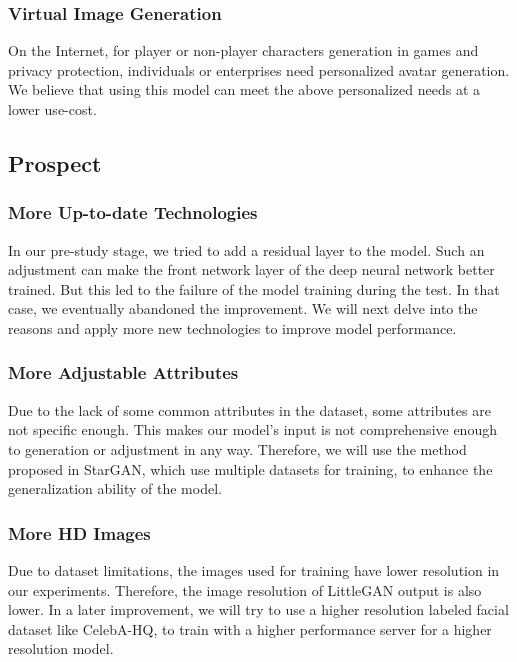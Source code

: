 \subsubsection*{Virtual Image Generation}
On the Internet, for player or non-player characters generation in games and privacy protection,
individuals or enterprises need personalized avatar generation.
We believe that using this model can meet the above personalized needs at a lower use-cost.

\subsection{Prospect}

\subsubsection*{More Up-to-date Technologies}

In our pre-study stage, we tried to add a residual layer to the model.
Such an adjustment can make the front network layer of the deep neural network better trained.
But this led to the failure of the model training during the test.
    In that case, we eventually abandoned the improvement.
We will next delve into the reasons and apply more new technologies to improve model performance.


\subsubsection*{More Adjustable Attributes}

Due to the lack of some common attributes in the dataset,
    some attributes are not specific enough.
This makes our model's input is not comprehensive enough to generation or adjustment in any way.
Therefore, we will use the method proposed in StarGAN,
    which use multiple datasets for training, to enhance the generalization ability of the model.


\subsubsection*{More HD Images}

Due to dataset limitations, the images used for training have lower resolution in our experiments.
Therefore, the image resolution of LittleGAN output is also lower.
In a later improvement, we will try to use a higher resolution labeled facial dataset like CelebA-HQ,
    to train with a higher performance server for a higher resolution model.


